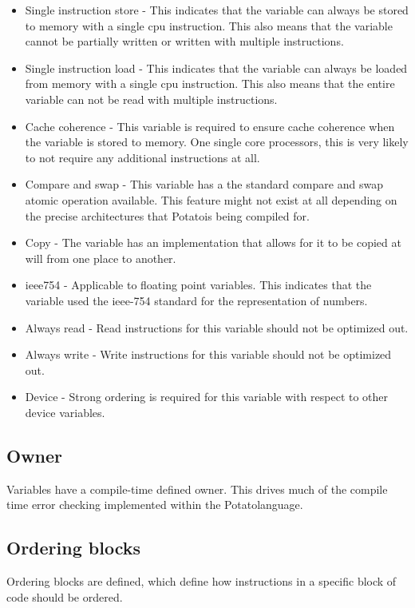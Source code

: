 \documentclass[12pt]{article}
\newcommand{\progLangNameSpace}{Potato\space }
\begin{document}
\begin{itemize}
\item Single instruction store - This indicates that the variable can always be stored to memory with a single cpu instruction. This also means that the variable cannot be partially written or written with multiple instructions.
\item Single instruction load - This indicates that the variable can always be loaded from memory with a single cpu instruction. This also means that the entire variable can not be read with multiple instructions.
\item Cache coherence - This variable is required to ensure cache coherence when the variable is stored to memory. One single core processors, this is very likely to not require any additional instructions at all.
\item Compare and swap - This variable has a the standard compare and swap atomic operation available. This feature might not exist at all depending on the precise architectures that \progLangNameSpace is being compiled for.
\item Copy - The variable has an implementation that allows for it to be copied at will from one place to another.
\item ieee754 - Applicable to floating point variables. This indicates that the variable used the ieee-754 standard for the representation of numbers.
\item Always read - Read instructions for this variable should not be optimized out.
\item Always write - Write instructions for this variable should not be optimized out.
\item Device - Strong ordering is required for this variable with respect to other device variables.
\end{itemize}

\subsection {Owner}

Variables have a compile-time defined owner. This drives much of the compile time error checking implemented within the \progLangNameSpace language.

\subsection {Ordering blocks}

Ordering blocks are defined, which define how instructions in a specific block of code should be ordered.
\end{document}
